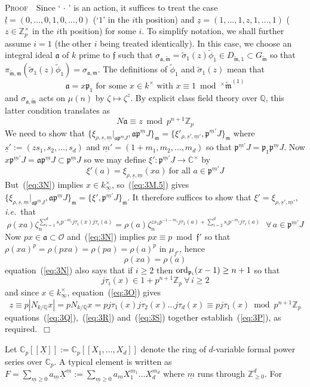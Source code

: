 \documentclass[12pt]{article}
\newcounter{rem}[section]%
\newcommand{\bbC}{\ensuremath{\mathbb{C}}}
\newcommand{\bbQ}{\ensuremath{\mathbb{Q}}}
\newcommand{\bbZ}{\ensuremath{\mathbb{Z}}}
\newcommand{\beql}[1]{\begin{equation}\label{#1}}
\newcommand{\bPf}{\noindent \textsc{Proof\ }}
\newcommand{\cO}{\ensuremath{\mathcal{O}}}
\newcommand{\eeq}{\end{equation}}
\newcommand{\ePf}{\hspace*{\fill}~$\Box$\vertsp\par}%
\newcommand{\fa}{\ensuremath{\mathfrak{a}}}
\newcommand{\ff}{\ensuremath{\mathfrak{f}}}
\newcommand{\fm}{\ensuremath{\mathfrak{m}}}
\newcommand{\fp}{\ensuremath{\mathfrak{p}}}
\newcommand{\ie}{\emph{i.e.}}
\newcommand{\ord}{{\rm ord}}
\newcommand{\refeq}[1]{~(\ref{eq:#1})}
\newcommand{\rem}{\refstepcounter{rem}\noindent{\sc Remark \therem}}%
\renewcommand{\therem}{\thesection.\arabic{rem}}
\newcommand{\vertsp}{\vspace{1ex}}
\newcommand{\tfm}{\ensuremath{{\tilde{\fm}}}}
\newcommand{\tphi}{\ensuremath{\tilde{\phi}}}
\newcommand{\tsigma}{\ensuremath{\tilde{\sigma}}}
\newcommand{\uinf}{\ensuremath{{\underline{\infty}}}}
\newcommand{\ul}{\ensuremath{{\underline{l}}}}
\newcommand{\um}{\ensuremath{{\underline{m}}}}
\newcommand{\us}{\ensuremath{{\underline{s}}}}
\newcommand{\uX}{\ensuremath{{\underline{X}}}}
\newcommand{\uz}{\ensuremath{{\underline{z}}}}
\begin{document}
\bPf\ Since `$\,\cdot\,$' is an action, it
suffices to treat the case $\ul=(0,\ldots,0,1,0,\ldots,0)$
(`$1$' in the $i$th position) and $\uz=(1,\ldots,1,z,1,\ldots,1)$
($z\in\bbZ_p^\times$ in the $i$th position) for some $i$.
To simplify notation, we shall further assume $i=1$ (the other
$i$ being treated identically).
In this case, we choose
an integral ideal $\fa$ of $k$ prime to $\ff$
such that $\sigma_{\fa,\tfm}=\tsigma_1(z)\tphi_1\in D_{\tfm,1}\subset G_{\tfm}$
so that $\pi_{\tfm,\fm}(\tsigma_1(z)\tphi_1)=\sigma_{\fa,\fm}$.
The definitions of $\tphi_1$ and $\tsigma_1(z)$ mean that
\beql{eq:3N}
\mbox{
$\fa=x\fp_1$ for some $x\in k^\times$ with $x\equiv 1
\bmod^\times \tfm^{(1)}$
}
\eeq
and $\sigma_{\fa,\tfm}$ acts on $\mu(n)$ by $\zeta\mapsto\zeta^z$.
By explicit class field theory over $\bbQ$, this latter condition
translates as
\beql{eq:3O}
N\fa\equiv z \bmod p^{n+1}\bbZ_p
\eeq
We need to show that
$
\{\xi_{\rho,\us,\um}|_{\fa\fp^\um J},\fa\fp^\um J\}_\fm=
\{\xi'_{\rho,\us',\um'},\fp^{\um'} J\}_\fm
$
where $\us':=(zs_1,s_2,\ldots,s_d)$ and
$\um'=(1+m_1,m_2,\ldots,m_d)$ so that
$\fp^{\um'}J=\fp_1\fp^\um J$.
Now $x\fp^{\um'}J=\fa\fp^\um J\subset \fp^\um J$
so we may define $\xi':\fp^{\um'}J\rightarrow \bbC^\times$ by
\[
\xi'(a)=\xi_{\rho,\us,\um}(xa) \ \mbox{for all $a\in\fp^{\um'}J$}
\]
But\refeq{3N} implies $x\in k_{\uinf}^\times$, so\refeq{3M.5} gives
$
\{\xi_{\rho,\us,\um}|_{\fa\fp^\um J},\fa\fp^\um J\}_\fm=
\{\xi',\fp^{\um'} J\}_\fm
$.
It therefore suffices to show that $\xi'=\xi_{\rho,\us',\um'}$, \ie\ that
\beql{eq:3P}
\rho(xa)\zeta_n^{\sum_{i=1}^d s_ip^{-m_i}j\tau_i(x)j\tau_i(a)}=
\rho(a)\zeta_n^{zs_1p^{-1-m_1}j\tau_1(a)+\sum_{i=2}^d s_ip^{-m_i}j\tau_i(a)}
\ \ \ \forall\,a\in\fp^{\um'}J
\eeq
Now $px\in\fa\subset\cO$ and\refeq{3N} implies $px\equiv p\bmod \ff'$
so that $\rho(xa)^p=\rho(pxa)=\rho(pa)=\rho(a)^p$ in $\mu_{f'}$,
hence
\beql{eq:3Q}
\rho(xa)=\rho(a)
\eeq
equation\refeq{3N} also says that if $i\geq 2$ then
$\ord_{\fp_i}(x-1)\geq n+1$ so that
\beql{eq:3R}
j\tau_i(x)\in 1+p^{n+1}\bbZ_p\ \forall\,i\geq 2
\eeq
and since $x\in k_{\uinf}^\times$, equation\refeq{3O}
gives
\beql{eq:3S}
z\equiv p|N_{k/\bbQ}x|= pN_{k/\bbQ}x=
pj\tau_1(x)j\tau_2(x)\ldots j\tau_d(x)
\equiv pj\tau_1(x) \bmod p^{n+1}\bbZ_p
\eeq
equations\refeq{3Q},\refeq{3R} and\refeq{3S} together establish\refeq{3P}, as required.\ePf
\noindent Let $\bbC_p[[\uX]]:=\bbC_p[[X_1,\ldots,X_d]]$
denote the ring of $d$-variable formal power series over
$\bbC_p$. A typical element is written as
$F=\sum_{\um\geq 0}a_\um \uX^\um:=
\sum_{\um\geq 0}a_\um X_1^{m_1}\ldots X_d^{m_d}$
where $\um$ runs through $\bbZ_{\geq 0}^d$. For
\end{document}
